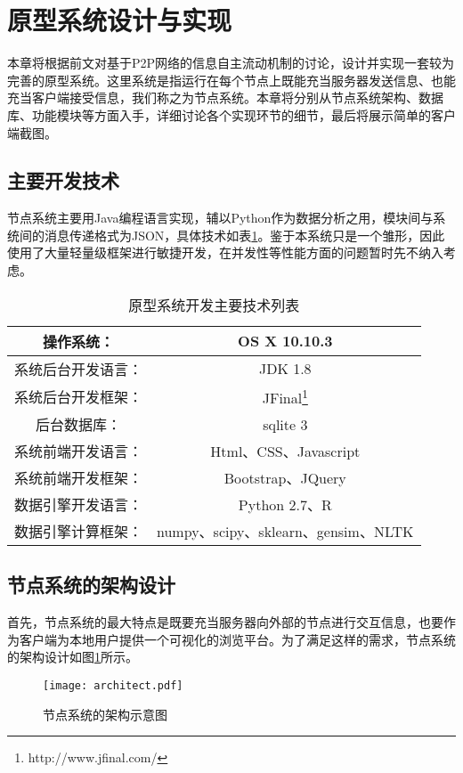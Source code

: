 \section{原型系统设计与实现}
本章将根据前文对基于P2P网络的信息自主流动机制的讨论，设计并实现一套较为完善的原型系统。这里系统是指运行在每个节点上既能充当服务器发送信息、也能充当客户端接受信息，我们称之为节点系统。本章将分别从节点系统架构、数据库、功能模块等方面入手，详细讨论各个实现环节的细节，最后将展示简单的客户端截图。

\subsection{主要开发技术}
节点系统主要用Java编程语言实现，辅以Python作为数据分析之用，模块间与系统间的消息传递格式为JSON，具体技术如表\ref{tbl:tech}。鉴于本系统只是一个雏形，因此使用了大量轻量级框架进行敏捷开发，在并发性等性能方面的问题暂时先不纳入考虑。

\begin{table}[ht]
\centering
\caption{原型系统开发主要技术列表}
\begin{tabular}{|c|c|} 
\hline
操作系统：& OS X 10.10.3 \\
\hline
系统后台开发语言：& JDK 1.8 \\
\hline
系统后台开发框架：& JFinal\footnote{http://www.jfinal.com/} \\
\hline
后台数据库：& sqlite 3 \\
\hline
系统前端开发语言：& Html、CSS、Javascript \\
\hline
系统前端开发框架：& Bootstrap、JQuery \\
\hline
数据引擎开发语言：& Python 2.7、R \\
\hline
数据引擎计算框架：& numpy、scipy、sklearn、gensim、NLTK \\
\hline
\end{tabular}
\label{tbl:tech}
\end{table}

\subsection{节点系统的架构设计}
首先，节点系统的最大特点是既要充当服务器向外部的节点进行交互信息，也要作为客户端为本地用户提供一个可视化的浏览平台。为了满足这样的需求，节点系统的架构设计如图\ref{fig:architect}所示。

\begin{figure}[!ht]
\centering
\texttt{[image: architect.pdf]}
\caption{节点系统的架构示意图}
\label{fig:architect}
\end{figure}

